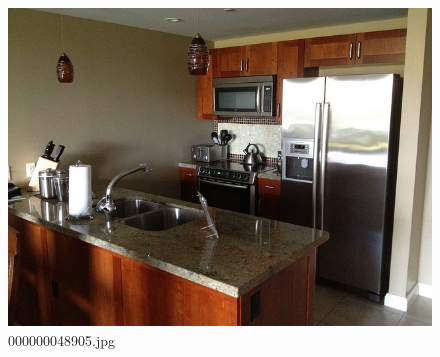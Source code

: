 \begin{figure}[h]
    \centering
    \includegraphics[width=0.8\linewidth]{../image set/hard/000000048905.jpg}
    \caption{000000048905.jpg}
\end{figure}

